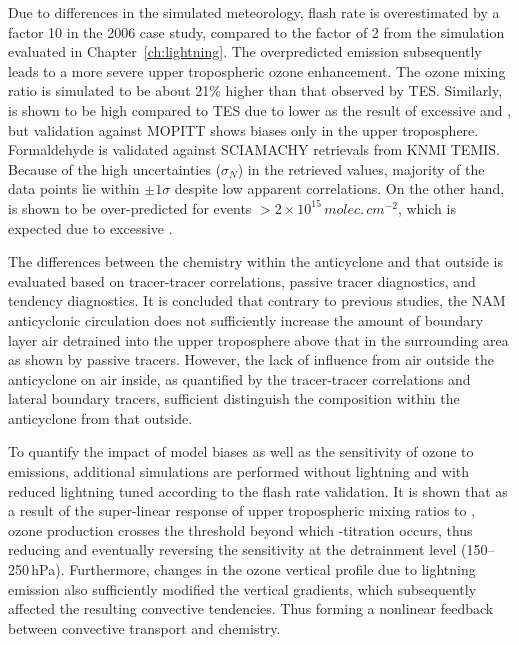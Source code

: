Due to differences in the simulated meteorology, flash rate is overestimated by a factor 10 in the
2006 case study, compared to the factor of 2 from the simulation evaluated in  Chapter~\ref{ch:lightning}.
The overpredicted {\lnox} emission subsequently leads to a more severe upper tropospheric
ozone enhancement. The ozone mixing ratio is simulated to be about 21\% higher than that
observed by TES. Similarly,  is shown to be high compared to TES due to lower
 as the result of excessive  and , but validation
against MOPITT shows biases only in the upper troposphere. Formaldehyde is validated against SCIAMACHY retrievals
from KNMI TEMIS. Because of the high uncertainties ($\sigma_N$) in the retrieved values,
majority of the data points lie within $\pm1\sigma$ despite low apparent correlations. On the
other hand,  is shown to be over-predicted for events $>2\times10^{15}\,\unit{molec.\,cm^{-2}}$,
which is expected due to excessive {\lnox}.

The differences between the chemistry within the anticyclone and that outside is evaluated
based on tracer-tracer correlations, passive tracer diagnostics, and tendency diagnostics. It
is concluded that contrary to previous studies, the NAM anticyclonic circulation does not
sufficiently increase the amount of boundary layer air detrained into the upper troposphere above
that in the surrounding area as shown by passive tracers. However, the lack of influence from air outside the anticyclone on air inside, as quantified
by the tracer-tracer correlations and lateral boundary tracers, sufficient distinguish the
composition within the anticyclone from that outside.

To quantify the impact of model biases as well as the sensitivity of ozone to {\lnox} emissions,
additional simulations are performed without lightning and with reduced lightning tuned according
to the flash rate validation. It is shown that as a result of the super-linear response of upper
tropospheric  mixing ratios to {\lnox}, ozone production crosses the threshold
beyond which -titration occurs, thus reducing and eventually reversing the
sensitivity at the detrainment level (150--250\,\unit{hPa}). Furthermore, changes in the ozone
vertical profile due to lightning emission also sufficiently modified the vertical gradients, which
subsequently affected the resulting convective tendencies. Thus forming a nonlinear feedback
between convective transport and chemistry.

